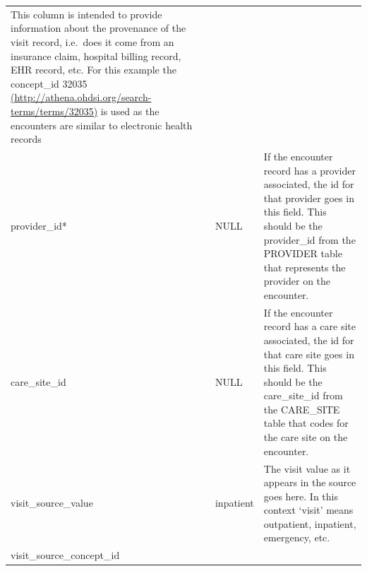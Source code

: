 \documentclass[]{book}
\begin{document}
\begin{longtable}[]{@{}lll@{}}
\begin{minipage}[t]{0.50\columnwidth}
This column is intended to provide information about the provenance of the visit record, i.e.~does it come from an insurance claim, hospital billing record, EHR record, etc. For this example the concept\_id 32035 \href{http://athena.ohdsi.org/search-terms/terms/32035}{(http://athena.ohdsi.org/search-terms/terms/32035)} is used as the encounters are similar to electronic health records\strut
\end{minipage}\tabularnewline
\begin{minipage}[t]{0.25\columnwidth}\raggedright
provider\_id*\strut
\end{minipage} & \begin{minipage}[t]{0.17\columnwidth}\raggedright
NULL\strut
\end{minipage} & \begin{minipage}[t]{0.50\columnwidth}\raggedright
If the encounter record has a provider associated, the id for that provider goes in this field. This should be the provider\_id from the PROVIDER table that represents the provider on the encounter.\strut
\end{minipage}\tabularnewline
\begin{minipage}[t]{0.25\columnwidth}\raggedright
care\_site\_id\strut
\end{minipage} & \begin{minipage}[t]{0.17\columnwidth}\raggedright
NULL\strut
\end{minipage} & \begin{minipage}[t]{0.50\columnwidth}\raggedright
If the encounter record has a care site associated, the id for that care site goes in this field. This should be the care\_site\_id from the CARE\_SITE table that codes for the care site on the encounter.\strut
\end{minipage}\tabularnewline
\begin{minipage}[t]{0.25\columnwidth}\raggedright
visit\_source\_value\strut
\end{minipage} & \begin{minipage}[t]{0.17\columnwidth}\raggedright
inpatient\strut
\end{minipage} & \begin{minipage}[t]{0.50\columnwidth}\raggedright
The visit value as it appears in the source goes here. In this context `visit' means outpatient, inpatient, emergency, etc.\strut
\end{minipage}\tabularnewline
\begin{minipage}[t]{0.25\columnwidth}\raggedright
visit\_source\_concept\_id\strut

\end{minipage}
\end{longtable}
\end{document}
